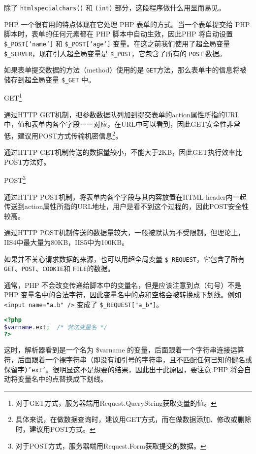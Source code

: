 除了 \texttt{htmlspecialchars()} 和 \texttt{(int)} 部分，这段程序做什么用显而易见。

PHP 一个很有用的特点体现在它处理 PHP 表单的方式。当一个表单提交给 PHP 脚本时，表单的任何元素都在 PHP 脚本中自动生效，因此PHP 将自动设置 \texttt{\$\_POST['name']} 和 \texttt{\$\_POST['age']} 变量。在这之前我们使用了超全局变量 \texttt{\$\_SERVER}，现在引入超全局变量是 \texttt{\$\_POST}，它包含了所有的 \texttt{POST} 数据。

如果表单提交数据的方法（method）使用的是 \texttt{GET}方法，那么表单中的信息将被储存到超全局变量 \texttt{\$\_GET} 中。

\begin{compactitem}
\item GET\footnote{对于GET方式，服务器端用Request.QueryString获取变量的值。}

通过HTTP GET机制，把参数数据队列加到提交表单的action属性所指的URL中，值和表单内各个字段一一对应，在URL中可以看到，因此GET安全性非常低，建议用POST方式传输机密信息\footnote{具体来说，在做数据查询时，建议用GET方式，而在做数据添加、修改或删除时，建议用POST方式。}。

通过HTTP GET机制传送的数据量较小，不能大于2KB，因此GET执行效率比POST方法好。

\item POST\footnote{对于POST方式，服务器端用Request.Form获取提交的数据。}

通过HTTP POST机制，将表单内各个字段与其内容放置在HTML header内一起传送到action属性所指的URL地址，用户是看不到这个过程的，因此POST安全性较高。

通过HTTP POST机制传送的数据量较大，一般被默认为不受限制。但理论上，IIS4中最大量为80KB，IIS5中为100KB。
\end{compactitem}




如果并不关心请求数据的来源，也可以用超全局变量 \texttt{\$\_REQUEST}，它包含了所有 \texttt{GET}、\texttt{POST}、\texttt{COOKIE}和 \texttt{FILE}的数据。

通常，PHP 不会改变传递给脚本中的变量名，但是应该注意到点（句号）不是 PHP 变量名中的合法字符，因此变量名中的点和空格会被转换成下划线。例如 \texttt{<input name="a.b" />} 变成了 \texttt{\$\_REQUEST["a\_b"]}。

\begin{lstlisting}[language=PHP]
<?php
$varname.ext;  /* 非法变量名 */
?>
\end{lstlisting}

这时，解析器看到是一个名为 \$varname 的变量，后面跟着一个字符串连接运算符，后面跟着一个裸字符串（即没有加引号的字符串，且不匹配任何已知的健名或保留字）\texttt{'ext'}。很明显这不是想要的结果，因此出于此原因，要注意 PHP 将会自动将变量名中的点替换成下划线。


